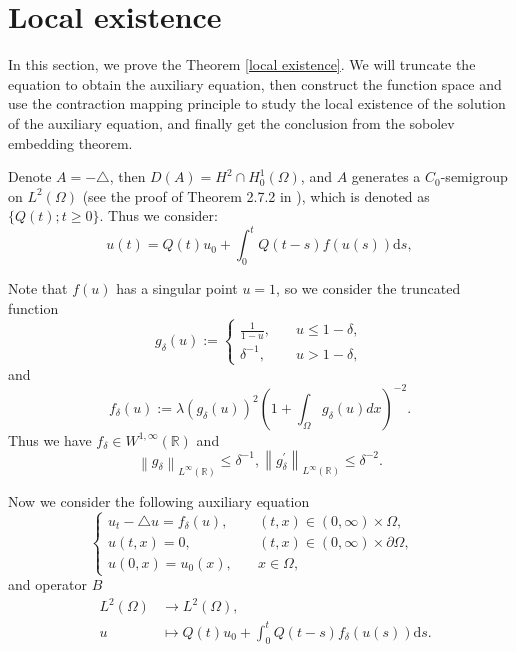 \documentclass{article}
\numberwithin{equation}{section}
\begin{document}
\section{Local existence}

\qquad In this section, we prove the Theorem \ref{local existence}. We will truncate the equation to obtain the auxiliary equation, then construct the function space and use the contraction mapping principle to study the local existence of the solution of the auxiliary equation, and finally get the conclusion from the sobolev embedding theorem.

Denote $ A=-\triangle $, then $D(A)=H^{2}\cap H_{0}^{1}(\Omega)$, and $A$ generates a $C_0$-semigroup on $L^{2}(\Omega)$ (see the proof of Theorem 2.7.2 in \cite{ref8}), which is denoted as $\{Q(t);t \geq 0\}$. Thus we consider:
\begin{equation*}
u(t)=Q(t) u_{0}+\int_{0}^{t} Q(t-s) f(u(s)) \mathrm{d} s,
\end{equation*}

Note that $f(u)$ has a singular point $u=1$, so we consider the truncated function
\begin{equation*}
 g _{\delta}(u):=\left\{\begin{array}{ll}\frac{1}{1-u}, & \quad u \le 1-\delta ,
\\ \delta^{-1}, & \quad u>1-\delta,
\end{array}\right.
\end{equation*}
and
\begin{equation}
f_{\delta}(u):=\lambda\left(g_{\delta}(u)\right)^{2}\left(1+\int_{\Omega} g_{\delta}(u) d x\right)^{-2}.\label{048}
\end{equation}
Thus we have $f_{\delta} \in W^{1, \infty}(\mathbb{R})$ and
\begin{equation}
\left\|g_{\delta}\right\|_{L^{\infty}(\mathbb{R})} \le \delta^{-1}, \left\|g_{\delta}^{\prime}\right\|_{L^{\infty}(\mathbb{R})} \le \delta^{-2}.
\label{013}
\end{equation}

Now we consider the following auxiliary equation
\begin{equation}
\left\{\begin{array}{lll}
 u_{t}-\triangle u=f_{\delta}(u), \quad & (t,x)\in (0, \infty)\times\Omega  ,
\\  u(t, x)=0, \quad   &(t,x)\in (0, \infty)\times \partial \Omega,
\\ u(0, x)=u_{0}(x), \quad  &x\in  \Omega ,
\end{array}\quad \right. \label{014}
\end{equation}
and operator $B$
\begin{equation}
\begin{array}{lll}
&L^2(\Omega) &\to L^2(\Omega),
\\ &u  &\mapsto  Q(t) u_{0}+\int_{0}^{t} Q(t-s) f_{\delta}(u(s)) \mathrm{d} s.
\end{array}
\end{equation}
\end{document}
